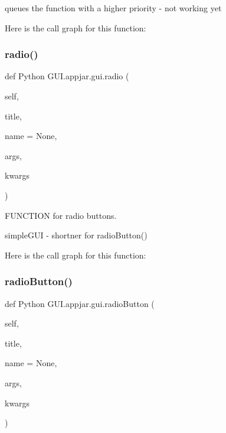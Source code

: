 \begin{DoxyVerb}
\begin{DoxyVerb}queues the function with a higher priority - not working yet \end{DoxyVerb}
 Here is the call graph for this function\+:
\mbox{\label{class_python_01_g_u_i_1_1appjar_1_1gui_a52874b3cff3bee7fc67bf50266023dbd}} 
\subsubsection{\texorpdfstring{radio()}{radio()}}
{\footnotesize\ttfamily def Python G\+U\+I.\+appjar.\+gui.\+radio (\begin{DoxyParamCaption}\item[{}]{self,  }\item[{}]{title,  }\item[{}]{name = {\ttfamily None},  }\item[{}]{args,  }\item[{}]{kwargs }\end{DoxyParamCaption})}



F\+U\+N\+C\+T\+I\+ON for radio buttons. 

\begin{DoxyVerb}simpleGUI - shortner for radioButton() \end{DoxyVerb}
 Here is the call graph for this function\+:
\mbox{\label{class_python_01_g_u_i_1_1appjar_1_1gui_aa3c072d4412ccc2f41629185ca0efd4d}} 
\subsubsection{\texorpdfstring{radio\+Button()}{radioButton()}}
{\footnotesize\ttfamily def Python G\+U\+I.\+appjar.\+gui.\+radio\+Button (\begin{DoxyParamCaption}\item[{}]{self,  }\item[{}]{title,  }\item[{}]{name = {\ttfamily None},  }\item[{}]{args,  }\item[{}]{kwargs }\end{DoxyParamCaption})}


\end{DoxyVerb}
